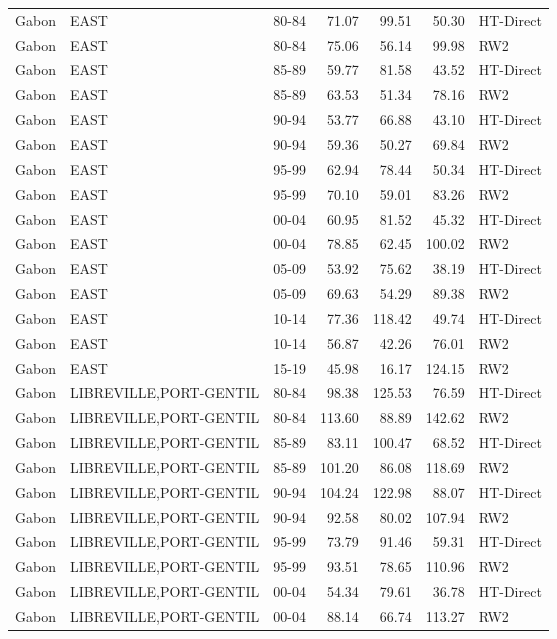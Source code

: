 \begin{longtable}{lllrrrl}
  Gabon & EAST & 80-84 & 71.07 & 99.51 & 50.30 & HT-Direct \\ 
  Gabon & EAST & 80-84 & 75.06 & 56.14 & 99.98 & RW2 \\ 
  Gabon & EAST & 85-89 & 59.77 & 81.58 & 43.52 & HT-Direct \\ 
  Gabon & EAST & 85-89 & 63.53 & 51.34 & 78.16 & RW2 \\ 
  Gabon & EAST & 90-94 & 53.77 & 66.88 & 43.10 & HT-Direct \\ 
  Gabon & EAST & 90-94 & 59.36 & 50.27 & 69.84 & RW2 \\ 
  Gabon & EAST & 95-99 & 62.94 & 78.44 & 50.34 & HT-Direct \\ 
  Gabon & EAST & 95-99 & 70.10 & 59.01 & 83.26 & RW2 \\ 
  Gabon & EAST & 00-04 & 60.95 & 81.52 & 45.32 & HT-Direct \\ 
  Gabon & EAST & 00-04 & 78.85 & 62.45 & 100.02 & RW2 \\ 
  Gabon & EAST & 05-09 & 53.92 & 75.62 & 38.19 & HT-Direct \\ 
  Gabon & EAST & 05-09 & 69.63 & 54.29 & 89.38 & RW2 \\ 
  Gabon & EAST & 10-14 & 77.36 & 118.42 & 49.74 & HT-Direct \\ 
  Gabon & EAST & 10-14 & 56.87 & 42.26 & 76.01 & RW2 \\ 
  Gabon & EAST & 15-19 & 45.98 & 16.17 & 124.15 & RW2 \\ 
  Gabon & LIBREVILLE,PORT-GENTIL & 80-84 & 98.38 & 125.53 & 76.59 & HT-Direct \\ 
  Gabon & LIBREVILLE,PORT-GENTIL & 80-84 & 113.60 & 88.89 & 142.62 & RW2 \\ 
  Gabon & LIBREVILLE,PORT-GENTIL & 85-89 & 83.11 & 100.47 & 68.52 & HT-Direct \\ 
  Gabon & LIBREVILLE,PORT-GENTIL & 85-89 & 101.20 & 86.08 & 118.69 & RW2 \\ 
  Gabon & LIBREVILLE,PORT-GENTIL & 90-94 & 104.24 & 122.98 & 88.07 & HT-Direct \\ 
  Gabon & LIBREVILLE,PORT-GENTIL & 90-94 & 92.58 & 80.02 & 107.94 & RW2 \\ 
  Gabon & LIBREVILLE,PORT-GENTIL & 95-99 & 73.79 & 91.46 & 59.31 & HT-Direct \\ 
  Gabon & LIBREVILLE,PORT-GENTIL & 95-99 & 93.51 & 78.65 & 110.96 & RW2 \\ 
  Gabon & LIBREVILLE,PORT-GENTIL & 00-04 & 54.34 & 79.61 & 36.78 & HT-Direct \\ 
  Gabon & LIBREVILLE,PORT-GENTIL & 00-04 & 88.14 & 66.74 & 113.27 & RW2 \\ 

\end{longtable}
